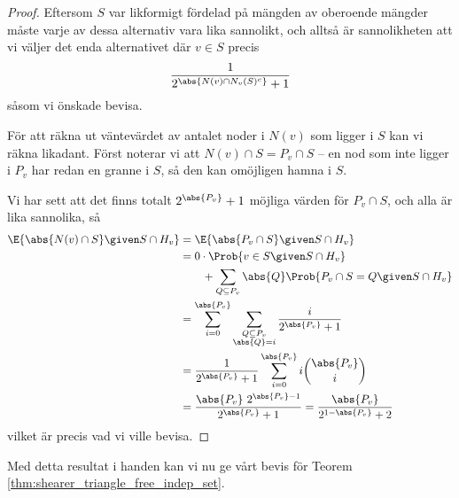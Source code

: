 \documentclass[nobib]{tufte-handout}
\begin{document}
\begin{lemma}
\begin{proof}
    Eftersom $S$ var likformigt fördelad på mängden av oberoende mängder måste varje av dessa alternativ vara lika sannolikt, och alltså är sannolikheten att vi väljer det enda alternativet där $v \in S$ precis
    $$\frac{1}{2^{\abs{N(v) \cap N_v(S)^c}} + 1}$$
    såsom vi önskade bevisa.

    För att räkna ut väntevärdet av antalet noder i $N(v)$ som ligger i $S$ kan vi räkna likadant. Först noterar vi att $N(v) \cap S = P_v \cap S$ -- en nod som inte ligger i $P_v$ har redan en granne i $S$, så den kan omöjligen hamna i $S$.
    
    Vi har sett att det finns totalt $2^{\abs{P_v}} + 1$ möjliga värden för $P_v \cap S$, och alla är lika sannolika, så
    \begin{align*}
      \E{\abs{N(v) \cap S} \given S \cap H_v} &= \E{\abs{P_v \cap S} \given S \cap H_v}\\
      &= 0\cdot \Prob{v \in S \given S \cap H_v}\\
      &\qquad + \sum_{Q \subseteq P_v} \abs{Q}\Prob{P_v \cap S = Q \given S \cap H_v}\\
      &= \sum_{i=0}^{\abs{P_v}} \sum_{\substack{Q \subseteq P_v\\\abs{Q} = i}} \frac{i}{2^{\abs{P_v}} + 1}\\
      &= \frac{1}{2^{\abs{P_v}} + 1}\sum_{i=0}^{\abs{P_v}} i\binom{\abs{P_v}}{i}\\
      &= \frac{\abs{P_v}\,\, 2^{\abs{P_v} - 1}}{2^{\abs{P_v}} + 1} = \frac{\abs{P_v}}{2^{1-\abs{P_v}} + 2}
    \end{align*}
    vilket är precis vad vi ville bevisa.
  \end{proof}
\end{lemma}

Med detta resultat i handen kan vi nu ge vårt bevis för Teorem \ref{thm:shearer_triangle_free_indep_set}.
\end{document}
